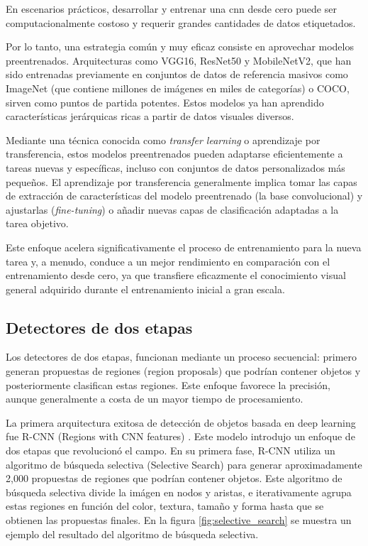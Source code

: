 \documentclass[11pt,spanish,listoffigures,listoftables]{tfgetsinf}
\begin{document}
En escenarios prácticos, desarrollar y entrenar una \gls{cnn} desde cero puede ser computacionalmente costoso y requerir grandes cantidades de datos etiquetados.

Por lo tanto, una estrategia común y muy eficaz consiste en aprovechar modelos preentrenados. Arquitecturas como VGG16, ResNet50 y MobileNetV2, que han sido entrenadas previamente en conjuntos de datos de referencia masivos como ImageNet\cite{ImageNet} (que contiene millones de imágenes en miles de categorías) o COCO\cite{lin2015microsoftcococommonobjects}, sirven como puntos de partida potentes. Estos modelos ya han aprendido características jerárquicas ricas a partir de datos visuales diversos.

Mediante una técnica conocida como \textit{transfer learning} o aprendizaje por transferencia, estos modelos preentrenados pueden adaptarse eficientemente a tareas nuevas y específicas, incluso con conjuntos de datos personalizados más pequeños. El aprendizaje por transferencia generalmente implica tomar las capas de extracción de características del modelo preentrenado (la base convolucional) y ajustarlas (\textit{fine-tuning}) o añadir nuevas capas de clasificación adaptadas a la tarea objetivo.

Este enfoque acelera significativamente el proceso de entrenamiento para la nueva tarea y, a menudo, conduce a un mejor rendimiento en comparación con el entrenamiento desde cero, ya que transfiere eficazmente el conocimiento visual general adquirido durante el entrenamiento inicial a gran escala.





\subsection{Detectores de dos etapas} \label{sec:two_stage_detectors}
Los detectores de dos etapas, funcionan mediante un proceso secuencial: primero generan propuestas de regiones (region proposals) que podrían contener objetos y posteriormente clasifican estas regiones. Este enfoque favorece la precisión, aunque generalmente a costa de un mayor tiempo de procesamiento.

La primera arquitectura exitosa de detección de objetos basada en deep learning fue R-CNN (Regions with CNN features) \cite{girshick2014richfeaturehierarchiesaccurate}. Este modelo introdujo un enfoque de dos etapas que revolucionó el campo. En su primera fase, R-CNN utiliza un algoritmo de búsqueda selectiva (Selective Search) para generar aproximadamente 2,000 propuestas de regiones que podrían contener objetos. Este algoritmo de búsqueda selectiva divide la imágen en nodos y aristas, e iterativamente agrupa estas regiones en función del color, textura, tamaño y forma hasta que se obtienen las propuestas finales. En la figura \ref{fig:selective_search} se muestra un ejemplo del resultado del algoritmo de búsqueda selectiva.
\end{document}
